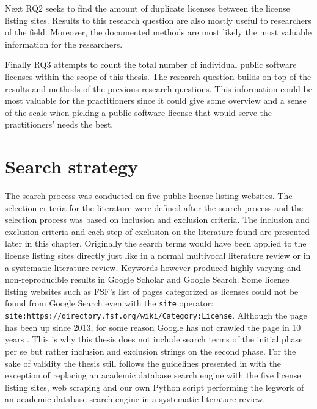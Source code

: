 Next RQ2 seeks to find the amount of duplicate licenses between the license listing sites. Results to this research question are also mostly useful to researchers of the field. Moreover, the documented methods are most likely the most valuable information for the researchers.

Finally RQ3 attempts to count the total number of individual public software licenses within the scope of this thesis. The research question builds on top of the results and methods of the previous research questions. This information could be most valuable for the practitioners since it could give some overview and a sense of the scale when picking a public software license that would serve the practitioners' needs the best.

\section{Search strategy}
The search process was conducted on five public license listing websites. The selection criteria for the literature were defined after the search process and the selection process was based on inclusion and exclusion criteria. The inclusion and exclusion criteria and each step of exclusion on the literature found are presented later in this chapter. Originally the search terms would have been applied to the license listing sites directly just like in a normal multivocal literature review or in a systematic literature review. Keywords however produced highly varying and non-reproducible results in Google Scholar and Google Search. Some license listing websites such as FSF's list of pages categorized as licenses could not be found from Google Search even with the \texttt{site} operator: \\
\texttt{site:https://directory.fsf.org/wiki/Category:License}. Although the page has been up since 2013, for some reason Google has not crawled the page in 10 years \citep{fsf:licenselist}. This is why this thesis does not include search terms of the initial phase per se but rather inclusion and exclusion strings on the second phase. For the sake of validity the thesis still follows the guidelines presented in \cite{kitchenham2007} with the exception of replacing an academic database search engine with the five license listing sites, web scraping and our own Python script performing the legwork of an academic database search engine in a systematic literature review.

